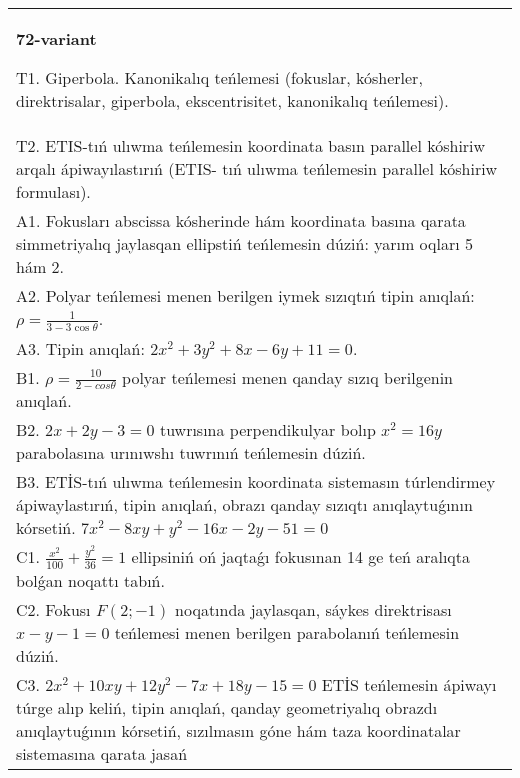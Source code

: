 \documentclass{article}
\begin{document}
\begin{tabular}{m{17cm}}
\textbf{72-variant}
\newline

T1. Giperbola. Kanonikalıq teńlemesi (fokuslar, kósherler, direktrisalar, giperbola, ekscentrisitet, kanonikalıq teńlemesi).\\

T2. ETIS-tıń ulıwma teńlemesin koordinata basın parallel kóshiriw arqalı ápiwayılastırıń (ETIS- tıń ulıwma teńlemesin parallel kóshiriw formulası).\\

A1. Fokusları abscissa kósherinde hám koordinata basına qarata simmetriyalıq jaylasqan ellipstiń teńlemesin dúziń: yarım oqları 5 hám 2.\\

A2. Polyar teńlemesi menen berilgen iymek sızıqtıń tipin anıqlań: $\rho=\frac{1}{3-3\cos\theta}$.\\

A3. Tipin anıqlań: $2 x^{2}+3 y^{2}+8 x-6 y+11=0$.\\

B1. $\rho = \frac{10}{2 - cos\theta}$ polyar teńlemesi menen qanday sızıq berilgenin anıqlań.  \\

B2. $2x + 2y - 3 = 0$ tuwrısına perpendikulyar bolıp $x^{2} = 16y$ parabolasına urınıwshı tuwrınıń teńlemesin dúziń.  \\

B3. ETİS-tıń ulıwma teńlemesin koordinata sistemasın túrlendirmey ápiwaylastırıń, tipin anıqlań, obrazı qanday sızıqtı anıqlaytuǵının kórsetiń. $7x^{2} - 8xy + y^{2} - 16x - 2y - 51 = 0$  \\

C1. $\frac{x^{2}}{100} + \frac{y^{2}}{36} = 1$ ellipsiniń oń jaqtaǵı fokusınan 14 ge teń aralıqta bolǵan noqattı tabıń.  \\

C2. Fokusı $F(2; - 1)$ noqatında jaylasqan, sáykes direktrisası $x - y - 1 = 0$ teńlemesi menen berilgen parabolanıń teńlemesin dúziń.  \\

C3. $2x^{2} + 10xy + 12y^{2} - 7x + 18y - 15 = 0$ ETİS teńlemesin ápiwayı túrge alıp keliń, tipin anıqlań, qanday geometriyalıq obrazdı anıqlaytuǵının kórsetiń, sızılmasın góne hám taza koordinatalar sistemasına qarata jasań  \\

\end{tabular}
\vspace{1cm}
\end{document}

